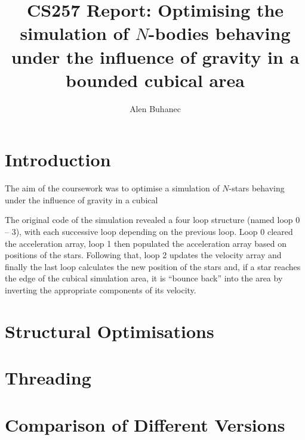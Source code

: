 \documentclass[11pt]{article} %
\title{CS257 Report: Optimising the simulation of $N$-bodies behaving under the influence of gravity in a bounded cubical area}
\author{Alen Buhanec}
\date{}
\begin{document}
\maketitle
\section{Introduction}

The aim of the coursework was to optimise a simulation of $N$-stars behaving under the influence of gravity in a cubical

The original code of the simulation revealed a four loop structure (named loop 0 -- 3), with each successive loop depending on the previous loop. Loop 0 cleared the acceleration array, loop 1 then populated the acceleration array based on positions of the stars. Following that, loop 2 updates the velocity array and finally the last loop calculates the new position of the stars and, if a star reaches the edge of the cubical simulation area, it is ``bounce back'' into the area by inverting the appropriate components of its velocity.



\section{Structural Optimisations}


\section{Threading}


\section{Comparison of Different Versions}
\end{document}
